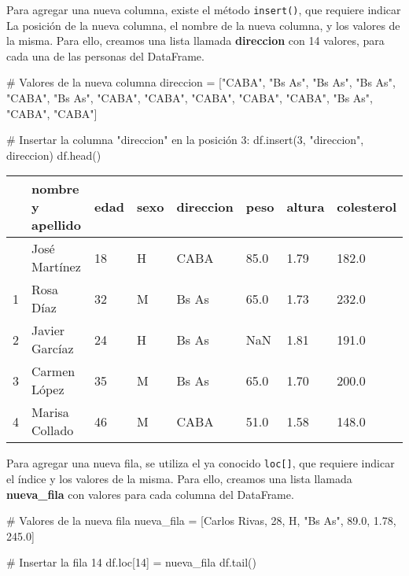 \documentclass[
  letterpaper,
  DIV=11,
  numbers=noendperiod]{scrreprt}
\newenvironment{Shaded}{\begin{snugshade}}{\end{snugshade}}
\newcommand{\CommentTok}[1]{\textcolor[rgb]{0.37,0.37,0.37}{#1}}
\newcommand{\DecValTok}[1]{\textcolor[rgb]{0.68,0.00,0.00}{#1}}
\newcommand{\FloatTok}[1]{\textcolor[rgb]{0.68,0.00,0.00}{#1}}
\newcommand{\NormalTok}[1]{\textcolor[rgb]{0.00,0.23,0.31}{#1}}
\newcommand{\OperatorTok}[1]{\textcolor[rgb]{0.37,0.37,0.37}{#1}}
\newcommand{\StringTok}[1]{\textcolor[rgb]{0.13,0.47,0.30}{#1}}
\begin{document}
Para agregar una nueva columna, existe el método \texttt{insert()}, que
requiere indicar La posición de la nueva columna, el nombre de la nueva
columna, y los valores de la misma. Para ello, creamos una lista llamada
\textbf{direccion} con 14 valores, para cada una de las personas del
DataFrame.

\begin{Shaded}
\begin{Highlighting}[]
\CommentTok{\# Valores de la nueva columna}
\NormalTok{direccion }\OperatorTok{=}\NormalTok{ [}\StringTok{"CABA"}\NormalTok{, }\StringTok{"Bs As"}\NormalTok{, }\StringTok{"Bs As"}\NormalTok{, }\StringTok{"Bs As"}\NormalTok{, }\StringTok{"CABA"}\NormalTok{, }\StringTok{"Bs As"}\NormalTok{, }\StringTok{"CABA"}\NormalTok{, }\StringTok{"CABA"}\NormalTok{, }\StringTok{"CABA"}\NormalTok{, }\StringTok{"CABA"}\NormalTok{, }\StringTok{"CABA"}\NormalTok{, }\StringTok{"Bs As"}\NormalTok{, }\StringTok{"CABA"}\NormalTok{, }\StringTok{"CABA"}\NormalTok{]}

\CommentTok{\# Insertar la columna "direccion" en la posición 3:}
\NormalTok{df.insert(}\DecValTok{3}\NormalTok{, }\StringTok{"direccion"}\NormalTok{, direccion)}
\NormalTok{df.head()}
\end{Highlighting}
\end{Shaded}

\begin{longtable}[]{@{}llllllll@{}}
\toprule\noalign{}
& nombre y apellido & edad & sexo & direccion & peso & altura &
colesterol \\
\midrule\noalign{}
\endhead
\bottomrule\noalign{}
\endlastfoot
0 & José Martínez & 18 & H & CABA & 85.0 & 1.79 & 182.0 \\
1 & Rosa Díaz & 32 & M & Bs As & 65.0 & 1.73 & 232.0 \\
2 & Javier Garcíaz & 24 & H & Bs As & NaN & 1.81 & 191.0 \\
3 & Carmen López & 35 & M & Bs As & 65.0 & 1.70 & 200.0 \\
4 & Marisa Collado & 46 & M & CABA & 51.0 & 1.58 & 148.0 \\
\end{longtable}

Para agregar una nueva fila, se utiliza el ya conocido
\texttt{loc{[}{]}}, que requiere indicar el índice y los valores de la
misma. Para ello, creamos una lista llamada \textbf{nueva\_fila} con
valores para cada columna del DataFrame.

\begin{Shaded}
\begin{Highlighting}[]
\CommentTok{\# Valores de la nueva fila}
\NormalTok{nueva\_fila }\OperatorTok{=}\NormalTok{ [}\StringTok{\textquotesingle{}Carlos Rivas\textquotesingle{}}\NormalTok{, }\DecValTok{28}\NormalTok{, }\StringTok{\textquotesingle{}H\textquotesingle{}}\NormalTok{, }\StringTok{"Bs As"}\NormalTok{, }\FloatTok{89.0}\NormalTok{, }\FloatTok{1.78}\NormalTok{, }\FloatTok{245.0}\NormalTok{]}

\CommentTok{\# Insertar la fila 14}
\NormalTok{df.loc[}\DecValTok{14}\NormalTok{] }\OperatorTok{=}\NormalTok{ nueva\_fila}
\NormalTok{df.tail()}
\end{Highlighting}
\end{Shaded}
\end{document}
